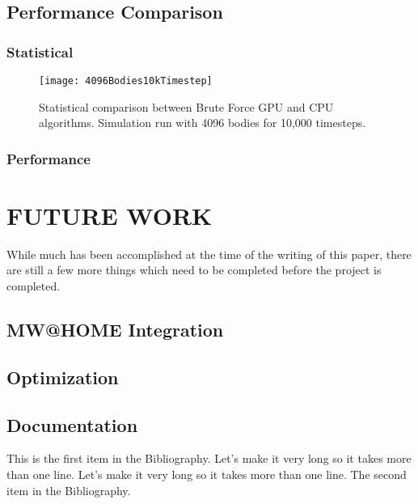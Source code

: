 \documentclass{thesis}
\begin{document}
\section{Performance Comparison}
\subsection{Statistical}
\begin{figure}[h]
    \caption{Statistical comparison between Brute Force GPU and CPU algorithms. Simulation run with 4096 bodies for 10,000 timesteps.}
    \label{fig:test}
    \centering
    \texttt{[image: 4096Bodies10kTimestep]}
\end{figure}
\subsection{Performance}

\chapter{FUTURE WORK}
While much has been accomplished at the time of the writing of this paper, there are still a few more things which need to be completed before the project is completed.

\section{MW@HOME Integration}
\section{Optimization}
\section{Documentation}

\begin{singlespace}
\begin{thebibliography}{99}
 This is the first item in the Bibliography.
Let's make it very long so it takes more than one line.
Let's make it very long so it takes more than one line.
 The second item in the Bibliography.
\end{thebibliography}
\end{singlespace}
\end{document}
